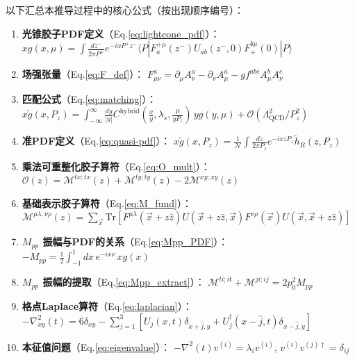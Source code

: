 \documentclass[11pt,a4paper]{article}
\newcommand{\LaMET}{\text{LaMET}}
\newcommand{\Tr}{\text{Tr}}
\newcommand{\hR}{\tilde{h}_R}
\newcommand{\Pz}{P_z}
\newcommand{\QCD}{\Lambda_{\text{QCD}}}
\begin{document}
以下汇总本推导过程中的核心公式（按出现顺序编号）：

\begin{enumerate}[label=(\arabic*), leftmargin=*]
    \item \textbf{光锥胶子PDF定义}（Eq.\ref{eq:lightcone_pdf}）：
    $x g(x, \mu) = \int \frac{dz^-}{2\pi P^+} e^{-ixP^+z^-} \langle P | F^{+\mu}_a(z^-) U_{ab}(z^-,0) F^{b\mu}_{+}(0) | P \rangle$

    \item \textbf{场强张量}（Eq.\ref{eq:F_def}）：
    $F^a_{\mu\nu} = \partial_\mu A^a_\nu - \partial_\nu A^a_\mu - g f^{abc} A^b_\mu A^c_\nu$

    \item \textbf{\LaMET 匹配公式}（Eq.\ref{eq:matching}）：
    $x\tilde{g}(x, \Pz) = \int_{-\infty}^{\infty} \frac{dy}{|y|} C^{\text{hybrid}}(\frac{x}{y}, \lambda_s, \frac{\mu}{y\Pz}) \, y g(y, \mu) + \mathcal{O}(\QCD^2/\Pz^2)$

    \item \textbf{准PDF定义}（Eq.\ref{eq:quasi-pdf}）：
    $x\tilde{g}(x, \Pz) = \frac{1}{\mathcal{N}} \int \frac{dz}{2\pi\Pz} e^{-ixz\Pz} \hR(z, \Pz)$

    \item \textbf{乘法可重整化胶子算符}（Eq.\ref{eq:O_mult}）：
    $\mathcal{O}(z) = \mathcal{M}^{tx;tx}(z) + \mathcal{M}^{ty;ty}(z) - 2\mathcal{M}^{xy;xy}(z)$

    \item \textbf{基础表示胶子算符}（Eq.\ref{eq:M_fund}）：
    $\mathcal{M}^{\mu\lambda,\nu\rho}(z) = \sum_{\vec{x}} \Tr[F^{\mu\lambda}(\vec{x}+z\hat{z}) U(\vec{x}+z\hat{z}, \vec{x}) F^{\nu\rho}(\vec{x}) U(\vec{x}, \vec{x}+z\hat{z})]$

    \item \textbf{$M_{pp}$ 振幅与PDF的关系}（Eq.\ref{eq:Mpp_PDF}）：
    $-M_{pp} = \frac{1}{2} \int_{-1}^{1} dx \, e^{-ix\nu} \, x g(x)$

    \item \textbf{$M_{pp}$ 振幅的提取}（Eq.\ref{eq:Mpp_extract}）：
    $\mathcal{M}^{ti;it} + \mathcal{M}^{ji;ij} = 2p_0^2 M_{pp}$

    \item \textbf{格点Laplace算符}（Eq.\ref{eq:laplacian}）：
    $-\nabla^2_{xy}(t) = 6\delta_{xy} - \sum_{j=1}^{3} [U_j(x,t)\delta_{x+\hat{j},y} + U^\dagger_j(x-\hat{j},t)\delta_{x-\hat{j},y}]$

    \item \textbf{本征值问题}（Eq.\ref{eq:eigenvalue}）：
    $-\nabla^2(t) v^{(i)} = \lambda_i v^{(i)}$, $v^{(i)} v^{(j)\dagger} = \delta_{ij}$


\end{enumerate}
\end{document}
